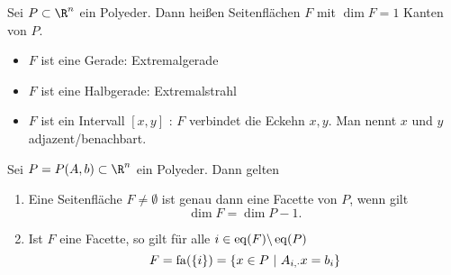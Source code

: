 \begin{definition}
	Sei $P \subset \R^n$ ein Polyeder. Dann heißen Seitenflächen $F$ mit $\dim F = 1$ Kanten von $P$.
	\begin{itemize}
		\item $F$ ist eine Gerade: Extremalgerade
		\item $F$ ist eine Halbgerade: Extremalstrahl
		\item $F$ ist ein Intervall $[x,y]$ : $F$ verbindet die Eckehn $x,y$. Man nennt $x$ und $y$ adjazent/benachbart.
	\end{itemize}
\end{definition}
\begin{korollar}
	Sei $P = P(A,b) \subset \R^n$ ein Polyeder. Dann gelten
	\begin{enumerate}[label = (\alph*)]
		\item Eine Seitenfläche $F \neq \emptyset$ ist genau dann eine Facette von $P$, wenn gilt
			\begin{equation*}
				\dim F = \dim P-1.
			\end{equation*}
		\item Ist $F$ eine Facette, so gilt für alle $i \in \operatorname{eq}(F)\backslash \operatorname{eq}(P)$
			 \begin{equation*}
				 F = \operatorname{fa}(\left\{i \right\}) = \left\{ x \in P\ |\ A_{i,\cdot}x = b_{i} \right\}
			\end{equation*}
	\end{enumerate}
\end{korollar}

